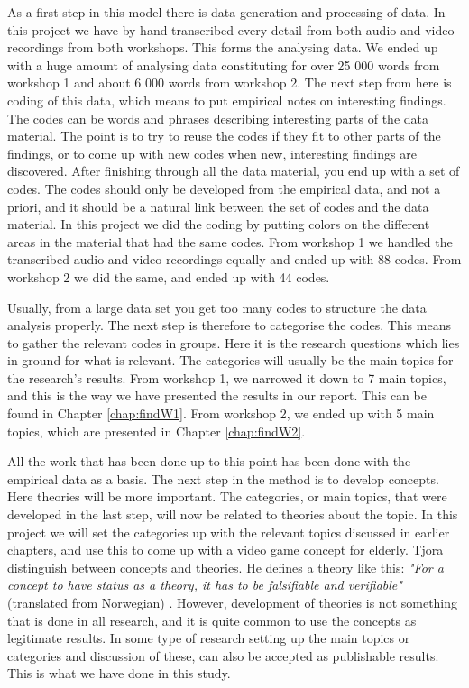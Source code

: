 As a first step in this model there is data generation and processing of data. In this project we have by hand transcribed every detail from both audio and video recordings from both workshops. This forms the analysing data. We ended up with a huge amount of analysing data constituting for over 25 000 words from workshop 1 and about 6 000 words from workshop 2. The next step from here is coding of this data, which means to put empirical notes on interesting findings. The codes can be words and phrases describing interesting parts of the data material. The point is to try to reuse the codes if they fit to other parts of the findings, or to come up with new codes when new, interesting findings are discovered. After finishing through all the data material, you end up with a set of codes. The codes should only be developed from the empirical data, and not a priori, and it should be a natural link between the set of codes and the data material. In this project we did the coding by putting colors on the different areas in the material that had the same codes. From workshop 1 we handled the transcribed audio and video recordings equally and ended up with 88 codes. From workshop 2 we did the same, and ended up with 44 codes.

Usually, from a large data set you get too many codes to structure the data analysis properly. The next step is therefore to categorise the codes. This means to gather the relevant codes in groups. Here it is the research questions which lies in ground for what is relevant. The categories will usually be the main topics for the research's results. From workshop 1, we narrowed it down to 7 main topics, and this is the way we have presented the results in our report. This can be found in Chapter \ref{chap:findW1}. From workshop 2, we ended up with 5 main topics, which are presented in Chapter \ref{chap:findW2}.

All the work that has been done up to this point has been done with the empirical data as a basis. The next step in the method is to develop concepts. Here theories will be more important. The categories, or main topics, that were developed in the last step, will now be related to theories about the topic. In this project we will set the categories up with the relevant topics discussed in earlier chapters, and use this to come up with a video game concept for elderly. Tjora \cite{tjora} distinguish between concepts and theories. He defines a theory like this: \emph{"For a concept to have status as a theory, it has to be falsifiable and verifiable"} (translated from Norwegian) \cite{tjora}. However, development of theories is not something that is done in all research, and it is quite common to use the concepts as legitimate results. In some type of research setting up the main topics or categories and discussion of these, can also be accepted as publishable results. This is what we have done in this study. 

